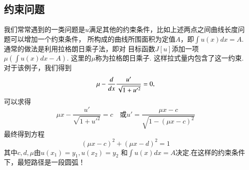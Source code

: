 \subsection{约束问题}
我们常常遇到的一类问题是$u$满足其他的约束条件，比如上述两点之间曲线长度问题可以增加一个约束条件，
所构成的曲线所围面积为定值$A$，即$\int u(x) dx = A$.通常的做法是利用拉格朗日乘子法，即对
目标函数$J[u]$添加一项$\mu\left( \int u(x) dx - A \right)$. 这里的$\mu$称为拉格朗日乘子.
这样拉式量内包含了这一约束.对于该例子，我们得到
\[
  \mu - \frac{d{}}{d{x}} \frac{u'}{\sqrt{1 + u'^2}} = 0,
\]
可以求得
\[
  \mu x-\frac{u'}{\sqrt{1+u'^2}}=c \quad \textrm{或} u'=\frac{\mu x-c}{\sqrt{1-(\mu x-c)^2}}
 \]
最终得到方程
\[
  (\mu x - c)^2 + (\mu x -d)^2 = 1
\]
其中$c,d,\mu$由$u(x_1)=y_1, u(x_2) = y_2$ 和$\int u(x) dx = A$决定.在这样的约束条件下，最短路径是一段圆弧！

